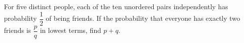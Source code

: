 For five distinct people, each of the ten unordered pairs independently has probability $\dfrac{1}{2}$ of being friends. If the probability that everyone has exactly two friends is $\dfrac{p}{q}$ in lowest terms, find $p+q$.
